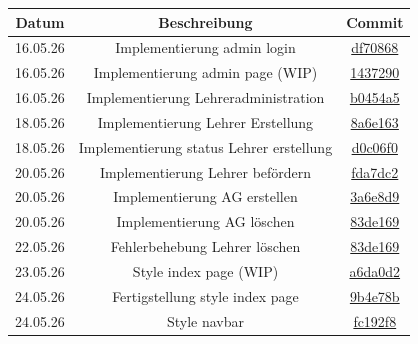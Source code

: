 \begin{center}
	\begin{tabular}{| c | c | c |}
		\hline
		Datum & Beschreibung & Commit \\[0.5ex]
		\hline\hline
		16.05.26 & Implementierung admin login & \href{https://github.com/Sobottasgithub/AG-Verwaltung/commit/df7086820b3bf3828f139b616c4e4558e9ef2177}{df70868}\\		
		\hline
		16.05.26 & Implementierung admin page (WIP) & \href{https://github.com/Sobottasgithub/AG-Verwaltung/commit/1437290a6024cde55a41d04f7dac666319a99f6d}{1437290}\\		
		\hline
		16.05.26 & Implementierung Lehreradministration & \href{https://github.com/Sobottasgithub/AG-Verwaltung/commit/b0454a5d2dba31f58cd35f697c0550e7020d36cb}{b0454a5}\\		
		\hline
		18.05.26 & Implementierung Lehrer Erstellung & \href{https://github.com/Sobottasgithub/AG-Verwaltung/commit/8a6e163f1d5355df9a794bbb6f9c0480ad7d2c7a}{8a6e163}\\		
		\hline
		18.05.26 & Implementierung status Lehrer erstellung & \href{https://github.com/Sobottasgithub/AG-Verwaltung/commit/d0c06f0a432e67562fdd8810e8239160e8d49783}{d0c06f0}\\		
		\hline
		20.05.26 & Implementierung Lehrer befördern & \href{https://github.com/Sobottasgithub/AG-Verwaltung/commit/fda7dc2220ec3a46be3c32df4032ac43c3b2c5ec}{fda7dc2}\\
		\hline
		20.05.26 & Implementierung AG erstellen & \href{https://github.com/Sobottasgithub/AG-Verwaltung/commit/3a6e8d91afc5b7a6bef5b83c9eed9f30bbadaac0}{3a6e8d9}\\
		\hline
		20.05.26 & Implementierung AG löschen & \href{https://github.com/Sobottasgithub/AG-Verwaltung/commit/83de1692d49fc6e4a9194fb3021db1be69053e6a}{83de169}\\
		\hline
		22.05.26 & Fehlerbehebung Lehrer löschen & \href{https://github.com/Sobottasgithub/AG-Verwaltung/commit/83de1692d49fc6e4a9194fb3021db1be69053e6a}{83de169}\\
		\hline
		23.05.26 & Style index page (WIP) & \href{https://github.com/Sobottasgithub/AG-Verwaltung/commit/a6da0d2e9c428169ae46b40825321329f910d248}{a6da0d2}\\
		\hline
		24.05.26 & Fertigstellung style index page & \href{https://github.com/Sobottasgithub/AG-Verwaltung/commit/9b4e78bd9dcdefeb9cddff653b4078ae09c0c14f}{9b4e78b}\\
		\hline
		24.05.26 & Style navbar & \href{https://github.com/Sobottasgithub/AG-Verwaltung/commit/fc192f85b488433c80172247c2f7e6fe2d2837f7}{fc192f8}\\

\end{tabular}
\end{center}
